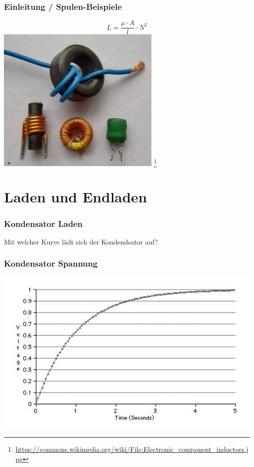 \begin{frame}
    \frametitle{Einleitung / Spulen-Beispiele}
    \begin{center}
    	$$L = \frac{\mu \cdot A}{l}\cdot N^2$$
        \includegraphics[width=0.6\textwidth]{a03/Spule.jpg}
        \footnote{\tiny \url{https://commons.wikimedia.org/wiki/File:Electronic_component_inductors.jpg}}
    \end{center}
\end{frame}


\section*{Laden und Endladen}

\begin{frame}
    \frametitle{Kondensator Laden}
    \begin{center}
        \Large{Mit welcher Kurve lädt sich der Kondendsator auf?}\\        
    \end{center}
\end{frame}

\begin{frame}
    \frametitle{Kondensator Spannung}
	\begin{center}
        \includegraphics[width=1\textwidth]{a03/Capacitor_Charge_Graph.jpg}
        \tiny \hyperlink{refs}{\cite{wc}}
    \end{center}
\end{frame}

